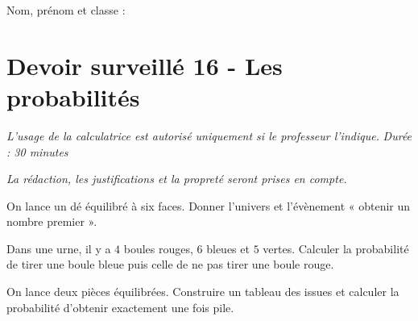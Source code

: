 \documentclass[a4paper,10pt]{report}
\begin{document}
\pagestyle{empty}
\noindent Nom, prénom et classe : \dotfill

\section*{Devoir surveillé 16 - Les probabilités}

\noindent \textit{L'usage de la calculatrice est autorisé uniquement si le professeur l'indique.} \hfill \textit{Durée : 30 minutes}

\medskip
\noindent \textit{La rédaction, les justifications et la propreté seront prises en compte.}


\begin{ex}[Univers]
On lance un dé équilibré à six faces. Donner l'univers et l'évènement « obtenir un nombre premier ».
\medskip\noindent\grandscarreaux{\linewidth}{2.5cm}
\end{ex}
\begin{ex}[Calcul]
Dans une urne, il y a $4$ boules rouges, $6$ bleues et $5$ vertes. Calculer la probabilité de tirer une boule bleue puis celle de ne pas tirer une boule rouge.
\medskip\noindent\grandscarreaux{\linewidth}{4cm}
\end{ex}
\begin{ex}
On lance deux pièces équilibrées. Construire un tableau des issues et calculer la probabilité d'obtenir exactement une fois pile.
\medskip\noindent\grandscarreaux{\linewidth}{5cm}
\end{ex}
\end{document}

